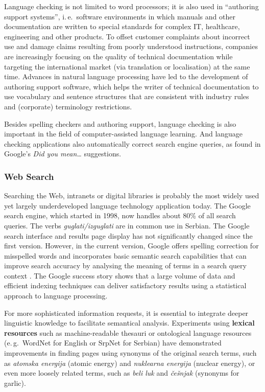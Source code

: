 \begin{multicols}{2}
Language checking is not limited to word processors; it is also used in “authoring support systems”, i.\,e.~software environments in which manuals and other documentation are written to special standards for complex IT, healthcare, engineering and other products. To offset customer complaints about incorrect use and damage claims resulting from poorly understood instructions, companies are increasingly focusing on the quality of technical documentation while targeting the international market (via translation or localisation) at the same time. Advances in natural language processing have led to the development of authoring support software, which helps the writer of technical documentation to use vocabulary and sentence structures that are consistent with industry rules and (corporate) terminology restrictions. 


Besides spelling checkers and authoring support, language checking is also important in the field of computer-assisted language learning. And language checking applications also automatically correct search engine queries, as found in Google's \textit{Did you mean\ldots}  suggestions. 
 
 \subsubsection {Web Search}

Searching the Web, intranets or digital libraries is probably the most widely used yet largely underdeveloped language technology application today. The Google search engine, which started in 1998, now handles about 80\% of all search queries. \cite{SPIEGEL} The verbs \textit{guglati/izguglati} are in common use in Serbian. The Google search interface and results page display has not significantly changed since the first version. However, in the current version, Google offers spelling correction for misspelled words and incorporates basic semantic search capabilities that can improve search accuracy by analysing the meaning of terms in a search query context \cite{PCWORLD}. The Google success story shows that a large volume of data and efficient indexing techniques can deliver satisfactory results using a statistical approach to language processing.

For more sophisticated information requests, it is essential to integrate deeper linguistic knowledge to facilitate semantical analysis. Experiments using \textbf{lexical resources} such as machine-readable thesauri or ontological language resources (e.\,g.~WordNet for English or SrpNet for Serbian) have demonstrated improvements in finding pages using synonyms of the original search terms, such as \textit{atomska energija} (atomic energy) and \textit{nuklearna energija} (nuclear energy), or even more loosely related terms, such as \textit{beli luk} and \textit{češnjak} (synonyms for garlic).


\end{multicols}

